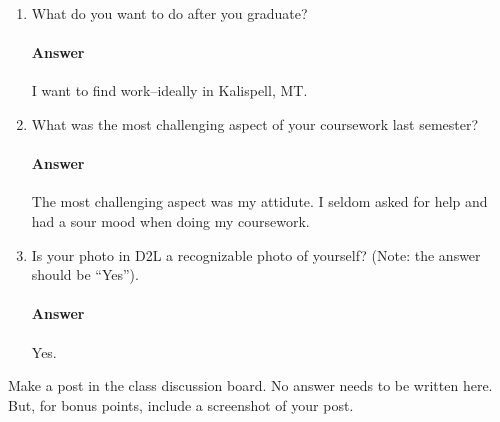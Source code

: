 \documentclass{article}
\begin{document}
\begin{enumerate}
     \item What do you want to do after you graduate?

         \paragraph{Answer} I want to find work--ideally in Kalispell, MT.

     \item What was the most challenging aspect of your coursework last semester?

         \paragraph{Answer} The most challenging aspect was my attidute. I seldom asked for help and had a sour mood when doing my coursework.

    \item Is your photo in D2L a recognizable photo of yourself?  (Note: the
        answer should be ``Yes'').

         \paragraph{Answer} Yes.

\end{enumerate}



Make a post in the class discussion board. No answer needs to be written here.
But, for bonus points, include a screenshot of your post.


\collab{\todo{}}
\end{document}

